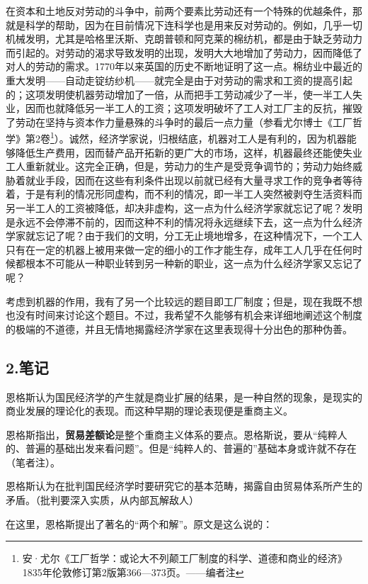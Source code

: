\documentclass[a4paper,twoside,12pt]{ctexart}
\begin{document}
在资本和土地反对劳动的斗争中，前两个要素比劳动还有一个特殊的优越条件，那就是科学的帮助，因为在目前情况下连科学也是用来反对劳动的。例如，几乎一切机械发明，尤其是哈格里沃斯、克朗普顿和阿克莱的棉纺机，都是由于缺乏劳动力而引起的。对劳动的渴求导致发明的出现，发明大大地增加了劳动力，因而降低了对人的劳动的需求。1770年以来英国的历史不断地证明了这一点。棉纺业中最近的重大发明——自动走锭纺纱机——就完全是由于对劳动的需求和工资的提高引起的；这项发明使机器劳动增加了一倍，从而把手工劳动减少了一半，使一半工人失业，因而也就降低另一半工人的工资；这项发明破坏了工人对工厂主的反抗，摧毁了劳动在坚持与资本作力量悬殊的斗争时的最后一点力量（参看尤尔博士《工厂哲学》第2卷\footnote{安·尤尔《工厂哲学：或论大不列颠工厂制度的科学、道德和商业的经济》1835年伦敦修订第2版第366—373页。——编者注}）。诚然，经济学家说，归根结底，机器对工人是有利的，因为机器能够降低生产费用，因而替产品开拓新的更广大的市场，这样，机器最终还能使失业工人重新就业。这完全正确，但是，劳动力的生产是受竞争调节的；劳动力始终威胁着就业手段，因而在这些有利条件出现以前就已经有大量寻求工作的竞争者等待着，于是有利的情况形同虚构，而不利的情况，即一半工人突然被剥夺生活资料而另一半工人的工资被降低，却决非虚构，这一点为什么经济学家就忘记了呢？发明是永远不会停滞不前的，因而这种不利的情况将永远继续下去，这一点为什么经济学家就忘记了呢？由于我们的文明，分工无止境地增多，在这种情况下，一个工人只有在一定的机器上被用来做一定的细小的工作才能生存，成年工人几乎在任何时候都根本不可能从一种职业转到另一种新的职业，这一点为什么经济学家又忘记了呢？

考虑到机器的作用，我有了另一个比较远的题目即工厂制度；但是，现在我既不想也没有时间来讨论这个题目。不过，我希望不久能够有机会来详细地阐述这个制度的极端的不道德，并且无情地揭露经济学家在这里表现得十分出色的那种伪善。 

\newpage

\subsection{2.笔记}
恩格斯认为国民经济学的产生就是商业扩展的结果，是一种自然的现象，是现实的商业发展的理论化的表现。而这种早期的理论表现便是重商主义。

恩格斯指出，\textbf{贸易差额论}是整个重商主义体系的要点。恩格斯说，要从“纯粹人的、普遍的基础出发来看问题”。但是“纯粹人的、普遍的”基础本身或许就不存在（笔者注）。

恩格斯认为在批判国民经济学时要研究它的基本范畴，揭露自由贸易体系所产生的矛盾。（批判要深入实质，从内部瓦解敌人）

在这里，恩格斯提出了著名的“两个和解”。原文是这么说的：
\end{document}
